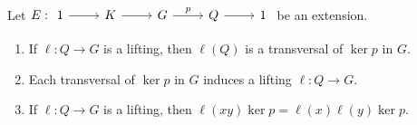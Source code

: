\begin{exercise}
	\label{xca:lifting}
	Let $E:
	\begin{tikzcd}
	1 & K & G & Q & 1
	\arrow[from=1-1, to=1-2]
	\arrow[from=1-2, to=1-3]
	\arrow["p", from=1-3, to=1-4]
	\arrow[from=1-4, to=1-5]
    \end{tikzcd}$
	be an extension. 
	\begin{enumerate}
		\item If $\ell\colon Q\to G$ is a lifting, then $\ell(Q)$
			is a transversal of $\ker p$ in $G$.
		\item Each transversal of $\ker p$ in $G$ induces a lifting $\ell\colon
			Q\to G$.
		\item If $\ell\colon Q\to G$ is a lifting, then 
			$\ell(xy)\ker p=\ell(x)\ell(y)\ker p$.
	\end{enumerate}
\end{exercise}

